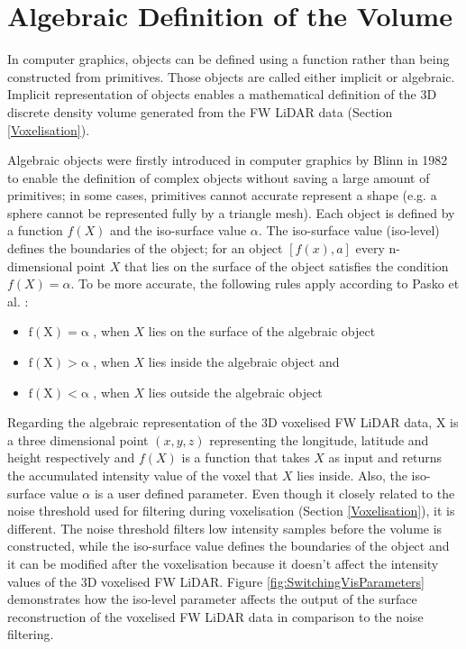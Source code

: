 \documentclass{subfiles}
\begin{document}
\section{Algebraic Definition of the Volume}\label{sec:AlgebracObjects}

In computer graphics, objects can be defined using a function rather than being constructed from primitives. Those objects are called either implicit or algebraic. Implicit representation of objects enables a mathematical definition of the 3D discrete density volume generated from the FW LiDAR data (Section \ref{Voxelisation}). 

\par Algebraic objects were firstly introduced in computer graphics by Blinn in 1982 \cite{Blinn1982} to enable the definition of complex objects without saving a large amount of primitives; in some cases, primitives cannot accurate represent a shape (e.g. a sphere cannot be represented fully by a triangle mesh). Each object is defined by a function $ \mathit{f(X)} $ and the iso-surface value $\alpha$. The iso-surface value (iso-level) defines the boundaries of the object; for an object $ [f(x),a]$ every n-dimensional point $ \mathit{X} $  that lies on the surface of the object satisfies the condition $ \mathit{f(X)=\alpha }  $. To be more accurate, the following rules apply according to Pasko et al. \cite{Pasko1994}: 
\begin{itemize}
	\item $	\mathrm{f(X) = \alpha }$ , when $X$ lies on the surface of the algebraic object
	\item $	\mathrm{f(X) > \alpha }$ , when $X$ lies inside the algebraic object and
	\item $	\mathrm{f(X) < \alpha }$ , when $X$ lies outside the algebraic object	 
\end{itemize}

\par Regarding the algebraic representation of the 3D voxelised FW LiDAR data, X is a three dimensional point $\mathit{(x, y, z) }$ representing the longitude, latitude and height respectively and ${f(X)}$ is a function that takes  $\mathit{X}$ as input and returns the accumulated intensity value of the voxel that  $\mathit{X}$ lies inside. {\color{Fuchsia} Also, the iso-surface value $\mathit{\alpha }$ is a user defined parameter. Even though it closely related to the noise threshold used for filtering during voxelisation (Section \ref{Voxelisation}), it is different. The noise threshold filters low intensity samples before the volume is constructed, while the iso-surface value defines the boundaries of the object and it can be modified after the voxelisation because it doesn't affect the intensity values of the 3D voxelised FW LiDAR. Figure \ref{fig:SwitchingVisParameters} demonstrates how the iso-level parameter affects the output of the surface reconstruction of the voxelised FW LiDAR data in comparison to the noise filtering}.
\end{document}
